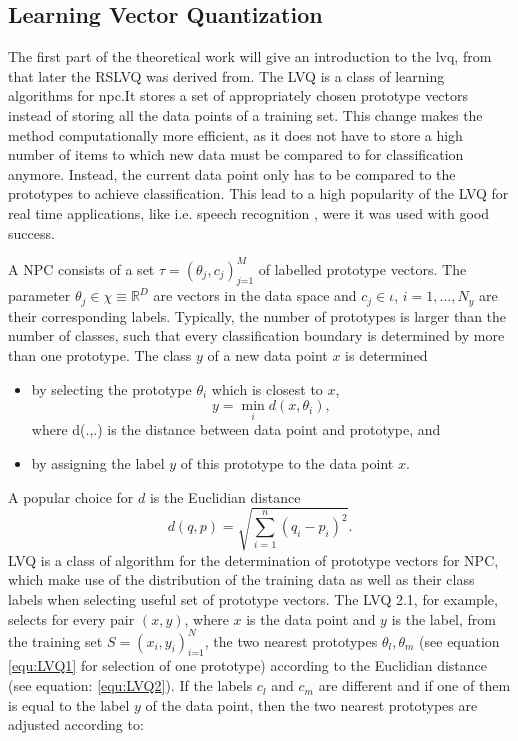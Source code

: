 \documentclass[12pt,oneside,a4paper,parskip]{scrbook}
\newcommand{\R}{\mathbb{R}}
\begin{document}
\subsection{Learning Vector Quantization}
The first part of the theoretical work will give an introduction to the \ac{lvq}, from that later 
the RSLVQ was derived from.
The LVQ is a class of learning algorithms for \ac{npc}.It stores a set of appropriately chosen
prototype vectors instead of storing all the data points of a training set. This change makes the method computationally more
efficient, as it does not have to store a high number of items to which new data must be compared to for classification anymore.
Instead, the current data point only has to be compared to the prototypes to achieve classification.
This lead to a high popularity of the LVQ for real time applications, like i.e. speech recognition \cite{lvqEx1,lvqEx2}, 
were it was used with good success.

A NPC consists of a set $\tau = (\theta_j, c_j)^M_\textit{j=1}$ of labelled prototype vectors. The parameter $\theta_j \in \chi \equiv \R^D$
are vectors in the data space and $c_j \in \iota$, $i = 1,\dots,N_y$ are their corresponding labels. Typically, 
the number of prototypes is larger than the number of classes, such that every classification boundary is determined by 
more than one prototype.
The class $y$ of a new data point $x$ is determined 

\begin{itemize}
  \item by selecting the prototype $\theta_i$ which is closest to $x$,
  \begin{equation}
    y = \displaystyle\min_{i} d(x,\theta_i),
    \label{equ:LVQ1}
  \end{equation}
  where d(.,.) is the distance between data point and prototype, and
  \item by assigning the label $y$ of this prototype to the data point $x$.
\end{itemize}

A popular choice for $d$ is the Euclidian distance 
\begin{equation}
  d(q,p) = \sqrt{\displaystyle\sum^n_\textit{i = 1}(q_i-p_i)^2}.
  \label{equ:LVQ2}
\end{equation}
LVQ is a class of algorithm for the determination of prototype vectors for NPC, which make use of the distribution of the
training data as well as their class labels when selecting useful set of prototype vectors. 
The LVQ 2.1, for example, selects for every pair $(x,y)$, where $x$ is the data point and $y$ is the label, from
the training set $S = (x_i,y_i)^N_\textit{i=1}$, the two nearest prototypes $\theta_l,\theta_m$ (see equation \ref{equ:LVQ1} 
for selection of one prototype) according to the Euclidian distance (see equation: \ref{equ:LVQ2}).
If the labels $c_l$ and $c_m$ are different and if one of them is equal to the label $y$ of the data point, then the two nearest
prototypes are adjusted according to:
\end{document}
